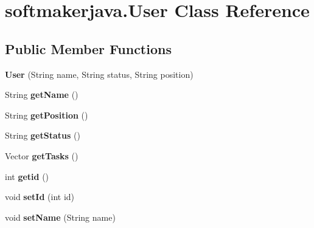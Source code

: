 \hypertarget{classsoftmakerjava_1_1_user}{}\section{softmakerjava.\+User Class Reference}
\label{classsoftmakerjava_1_1_user}
\subsection*{Public Member Functions}
\begin{DoxyCompactItemize}
\item 
{\bfseries User} (String name, String status, String position)\hypertarget{classsoftmakerjava_1_1_user_a6329a37981910cec226ce23aad8bfdcc}{}\label{classsoftmakerjava_1_1_user_a6329a37981910cec226ce23aad8bfdcc}

\item 
String {\bfseries get\+Name} ()\hypertarget{classsoftmakerjava_1_1_user_a33dcaf750bd4b95f6da89e773cb9ee8e}{}\label{classsoftmakerjava_1_1_user_a33dcaf750bd4b95f6da89e773cb9ee8e}

\item 
String {\bfseries get\+Position} ()\hypertarget{classsoftmakerjava_1_1_user_ad6bbbfa19a77534f020bf7646bcbeae7}{}\label{classsoftmakerjava_1_1_user_ad6bbbfa19a77534f020bf7646bcbeae7}

\item 
String {\bfseries get\+Status} ()\hypertarget{classsoftmakerjava_1_1_user_a1763522c917bedcb5c07221e3a07ff71}{}\label{classsoftmakerjava_1_1_user_a1763522c917bedcb5c07221e3a07ff71}

\item 
Vector {\bfseries get\+Tasks} ()\hypertarget{classsoftmakerjava_1_1_user_acc5945d8b6c5e3517d96019ccf2fe605}{}\label{classsoftmakerjava_1_1_user_acc5945d8b6c5e3517d96019ccf2fe605}

\item 
int {\bfseries getid} ()\hypertarget{classsoftmakerjava_1_1_user_af783a3e6819199ff4d238126462a6f25}{}\label{classsoftmakerjava_1_1_user_af783a3e6819199ff4d238126462a6f25}

\item 
void {\bfseries set\+Id} (int id)\hypertarget{classsoftmakerjava_1_1_user_a9378481c26f2b0010ea3ef7c11d6c402}{}\label{classsoftmakerjava_1_1_user_a9378481c26f2b0010ea3ef7c11d6c402}

\item 
void {\bfseries set\+Name} (String name)\hypertarget{classsoftmakerjava_1_1_user_a8b082d25d2ca7e051eb993efa51e2c87}{}\label{classsoftmakerjava_1_1_user_a8b082d25d2ca7e051eb993efa51e2c87}


\end{DoxyCompactItemize}
